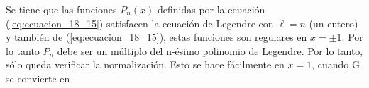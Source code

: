 Se tiene que las funciones $P_{n} (x)$ definidas por la ecuación (\ref{eq:ecuacion_18_15}) satisfacen la ecuación de Legendre con $\ell = n$ (un entero) y también de (\ref{eq:ecuacion_18_15}), estas funciones son regulares en $x = \pm 1$. Por lo tanto $P_{n}$ debe ser un múltiplo del n-ésimo polinomio de Legendre. Por lo tanto, sólo queda verificar la normalización. Esto se hace fácilmente en $x = 1$, cuando G se convierte en
